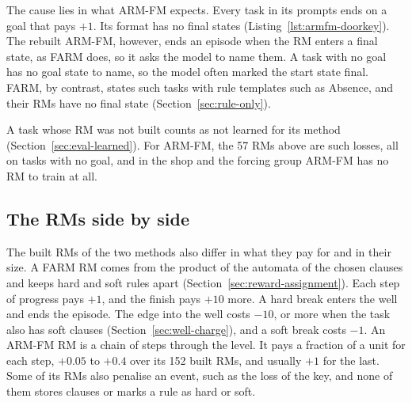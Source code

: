 \documentclass[11pt,english,listoffigures,listoftables]{tfgetsinf}
\newcommand{\gain}[1]{\textcolor{green!40!black}{\bfseries\boldmath #1}}  %
\newcommand{\loss}[1]{\textcolor{red!60!black}{\bfseries\boldmath #1}}  %
\begin{document}
The cause lies in what ARM-FM expects. Every task in its prompts ends on a goal that pays \gain{$+1$}. Its format has no final states (Listing~\ref{lst:armfm-doorkey}). The rebuilt ARM-FM, however, ends an episode when the RM enters a final state, as FARM does, so it asks the model to name them. A task with no goal has no goal state to name, so the model often marked the start state final. FARM, by contrast, states such tasks with rule templates such as Absence, and their RMs have no final state (Section~\ref{sec:rule-only}).

A task whose RM was not built counts as not learned for its method (Section~\ref{sec:eval-learned}). For ARM-FM, the 57 RMs above are such losses, all on tasks with no goal, and in the shop and the forcing group ARM-FM has no RM to train at all.

\subsection{The RMs side by side}
\label{sec:res-machines}

The built RMs of the two methods also differ in what they pay for and in their size. A FARM RM comes from the product of the automata of the chosen clauses and keeps hard and soft rules apart (Section~\ref{sec:reward-assignment}). Each step of progress pays \gain{$+1$}, and the finish pays \gain{$+10$} more. A hard break enters the well and ends the episode. The edge into the well costs \loss{$-10$}, or more when the task also has soft clauses (Section~\ref{sec:well-charge}), and a soft break costs \loss{$-1$}. An ARM-FM RM is a chain of steps through the level. It pays a fraction of a unit for each step, \gain{$+0.05$} to \gain{$+0.4$} over its 152 built RMs, and usually \gain{$+1$} for the last. Some of its RMs also penalise an event, such as the loss of the key, and none of them stores clauses or marks a rule as hard or soft.
\end{document}
